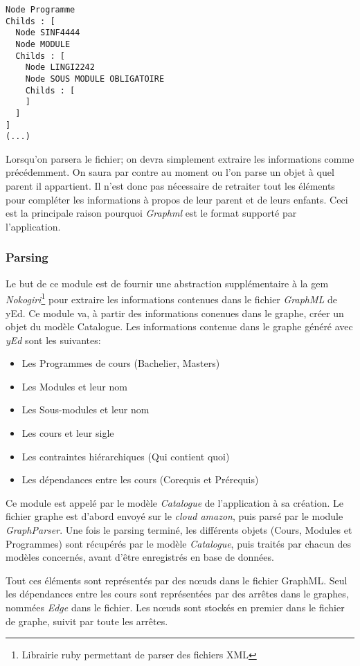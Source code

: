 \begin{lstlisting}
Node Programme
Childs : [
  Node SINF4444
  Node MODULE
  Childs : [
    Node LINGI2242
    Node SOUS MODULE OBLIGATOIRE
    Childs : [
    ]
  ]
]
(...)
\end{lstlisting}

Lorsqu'on parsera le fichier; on devra simplement extraire les informations comme précédemment. On saura par contre au moment ou l'on parse un objet à quel parent il appartient.  Il n'est donc pas nécessaire de retraiter tout les éléments pour compléter les informations à propos de leur parent et de leurs enfants. Ceci est la principale raison pourquoi \textit{Graphml} est le format supporté par l'application.


\subsubsection{Parsing}
\label{graph_parsing}
Le but de ce module est de fournir une abstraction supplémentaire à la gem \textit{Nokogiri}\footnote{Librairie ruby permettant de parser des fichiers XML} pour extraire les informations contenues dans le fichier \textit{GraphML} de yEd. Ce module va, à partir des informations conenues dans le graphe, créer un objet du modèle Catalogue. Les informations contenue dans le graphe généré avec \textit{yEd} sont les suivantes:
\begin{itemize}
\item Les Programmes de cours (Bachelier, Masters)
\item Les Modules et leur nom
\item Les Sous-modules et leur nom
\item Les cours et leur sigle
\item Les contraintes hiérarchiques (Qui contient quoi)
\item Les dépendances entre les cours (Corequis et Prérequis)
\end{itemize}


Ce module est appelé par le modèle \textit{Catalogue} de l'application à sa création. Le fichier graphe est d'abord envoyé sur le  \textit{cloud amazon}, puis parsé par le module \textit{GraphParser}. Une fois le parsing terminé, les différents objets (Cours, Modules et Programmes) sont récupérés par le modèle \textit{Catalogue}, puis traités par chacun des modèles concernés, avant d'être enregistrés en base de données. 

Tout ces éléments sont représentés par des nœuds dans le fichier GraphML. Seul les dépendances entre les cours sont représentées par des arrêtes dans le graphes, nommées \textit{Edge} dans le fichier. Les nœuds sont stockés en premier dans le fichier de graphe, suivit par toute les arrêtes. 

